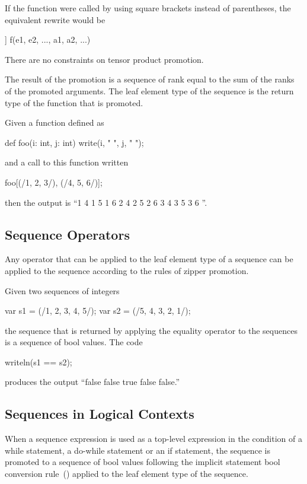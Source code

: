 If the function  were called by using square brackets instead
of parentheses, the equivalent rewrite would be
\begin{chapel}
[(e1, e2, ...) in [s1, s2, ...]] f(e1, e2, ..., a1, a2, ...)
\end{chapel}
There are no constraints on tensor product promotion.

The result of the promotion is a sequence of rank equal to the sum of
the ranks of the promoted arguments.  The leaf element type of the
sequence is the return type of the function that is promoted.

\begin{example}
Given a function defined as
\begin{chapel}
def foo(i: int, j: int) {
  write(i, " ", j, " ");
}
\end{chapel}
and a call to this function written
\begin{chapel}
foo[(/1, 2, 3/), (/4, 5, 6/)];
\end{chapel}
then the output is ``1 4 1 5 1 6 2 4 2 5 2 6 3 4 3 5 3 6 ''.
\end{example}

\subsection{Sequence Operators}
\label{Sequence_Operators}

Any operator that can be applied to the leaf element type of a
sequence can be applied to the sequence according to the rules of
zipper promotion.
\begin{example}
Given two sequences of integers
\begin{chapel}
var s1 = (/1, 2, 3, 4, 5/);
var s2 = (/5, 4, 3, 2, 1/);
\end{chapel}
the sequence that is returned by applying the equality operator to the
sequences is a sequence of bool values.  The code
\begin{chapel}
writeln(s1 == s2);
\end{chapel}
produces the output ``false false true false false.''
\end{example}

\subsection{Sequences in Logical Contexts}
\label{Sequences_in_Logical_Contexts}

When a sequence expression is used as a top-level expression in the
condition of a while statement, a do-while statement or an if
statement, the sequence is promoted to a sequence of bool values
following the implicit statement bool conversion
rule~() applied to the leaf
element type of the sequence.

